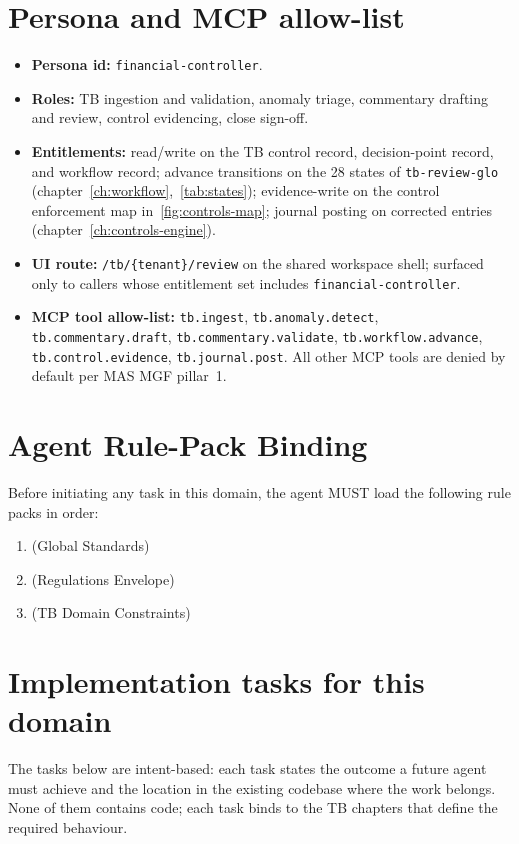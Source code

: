 \section{Persona and MCP allow-list}
\label{sec:agent-persona}
\begin{itemize}
  \item \textbf{Persona id:} \texttt{financial-controller}.
  \item \textbf{Roles:} TB ingestion and validation, anomaly triage,
    commentary drafting and review, control evidencing, close
    sign-off.
  \item \textbf{Entitlements:} read/write on the TB control record,
    decision-point record, and workflow record; advance transitions
    on the 28 states of \texttt{tb-review-glo}
    (chapter~\ref{ch:workflow},~\ref{tab:states}); evidence-write on
    the control enforcement map in~\ref{fig:controls-map}; journal
    posting on corrected entries (chapter~\ref{ch:controls-engine}).
  \item \textbf{UI route:} \texttt{/tb/\{tenant\}/review} on the
    shared workspace shell; surfaced only to callers whose
    entitlement set includes \texttt{financial-controller}.
  \item \textbf{MCP tool allow-list:}
    \texttt{tb.ingest}, \texttt{tb.anomaly.detect},
    \texttt{tb.commentary.draft}, \texttt{tb.commentary.validate},
    \texttt{tb.workflow.advance}, \texttt{tb.control.evidence},
    \texttt{tb.journal.post}. All other MCP tools are denied by
    default per MAS MGF pillar~1.
\end{itemize}

\section{Agent Rule-Pack Binding}
\label{sec:agent-rule-binding}
Before initiating any task in this domain, the agent MUST load the following rule packs in order:
\begin{enumerate}
  \item {} (Global Standards)
  \item {} (Regulations Envelope)
  \item {} (TB Domain Constraints)
\end{enumerate}

\section{Implementation tasks for this domain}
\label{sec:agent-tasks}
The tasks below are intent-based: each task states the outcome a
future agent must achieve and the location in the existing codebase
where the work belongs. None of them contains code; each task binds
to the TB chapters that define the required behaviour.

